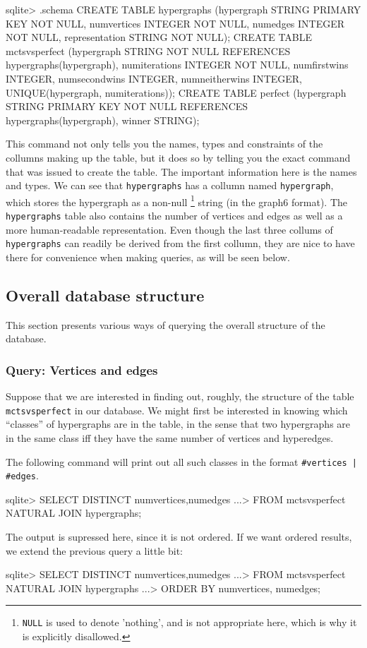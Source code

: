\begin{code}
sqlite> .schema
CREATE TABLE hypergraphs
(hypergraph STRING PRIMARY KEY NOT NULL,
 numvertices INTEGER NOT NULL,
 numedges INTEGER NOT NULL,
 representation STRING NOT NULL);
CREATE TABLE mctsvsperfect
(hypergraph STRING NOT NULL REFERENCES hypergraphs(hypergraph),
 numiterations INTEGER NOT NULL,
 numfirstwins INTEGER, numsecondwins INTEGER,
 numneitherwins INTEGER,
 UNIQUE(hypergraph, numiterations));
CREATE TABLE perfect
(hypergraph STRING PRIMARY KEY NOT NULL REFERENCES hypergraphs(hypergraph),
 winner STRING);
\end{code}
This command not only tells you the names, types and constraints of the collumns making up the table, but it does so by telling you the exact command that was issued to create the table.
The important information here is the names and types.
We can see that \texttt{hypergraphs} has a collumn named \texttt{hypergraph}, which stores the hypergraph as a non-null \footnote{\texttt{NULL} is used to denote 'nothing', and is not appropriate here, which is why it is explicitly disallowed.} string (in the graph6 format). 
The \texttt{hypergraphs} table also contains the number of vertices and edges as well as a more human-readable representation.
Even though the last three collums of \texttt{hypergraphs} can readily be derived from the first collumn, they are nice to have there for convenience when making queries, as will be seen below.


\subsection{Overall database structure}


This section presents various ways of querying the overall structure of the database.

\subsubsection{Query: Vertices and edges}

Suppose that we are interested in finding out, roughly, the structure of the table \texttt{mctsvsperfect} in our database.
We might first be interested in knowing which ``classes'' of hypergraphs are in the table, in the sense that two hypergraphs are in the same class iff they have the same number of vertices and hyperedges.

The following command will print out all such classes in the format \texttt{\#vertices | \#edges}.
\begin{code}
sqlite> SELECT DISTINCT numvertices,numedges
   ...> FROM mctsvsperfect NATURAL JOIN hypergraphs;
\end{code}
The output is supressed here, since it is not ordered.
If we want ordered results, we extend the previous query a little bit:
\begin{code}
sqlite> SELECT DISTINCT numvertices,numedges
   ...> FROM mctsvsperfect NATURAL JOIN hypergraphs
   ...> ORDER BY numvertices, numedges;
\end{code}

